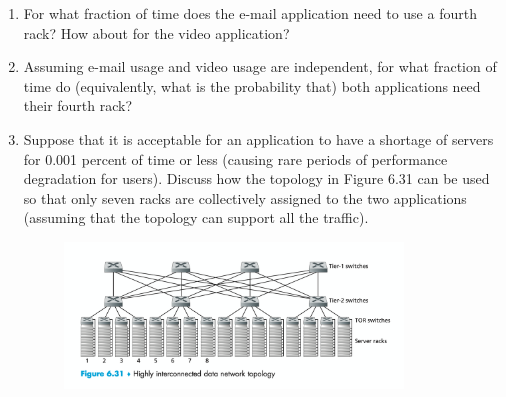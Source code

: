 \documentclass[12pt]{article}
\begin{document}
\begin{enumerate}
\begin{figure}[h!]
    \end{figure}
    \begin{enumerate}
        \item For what fraction of time does the e-mail application need to use a fourth rack? How about for the video application?
        \item Assuming e-mail usage and video usage are independent, for what fraction of time do (equivalently, what is the probability that) both applications need their fourth rack?
        \item Suppose that it is acceptable for an application to have a shortage of servers for 0.001 percent of time or less (causing rare periods of performance degradation for users). Discuss how the topology in Figure 6.31 can be used so that only seven racks are collectively assigned to the two applications (assuming that the topology can support all the traffic).
        \begin{figure}[h!]
            \centering
            \includegraphics[width=0.85\textwidth]{Fig6.31.png}
        \end{figure}
    \end{enumerate}
\end{enumerate}
\end{document}
